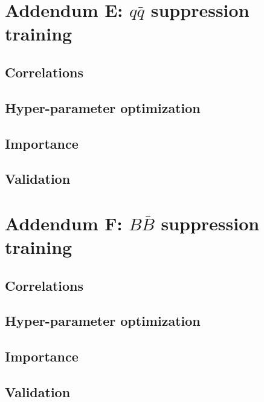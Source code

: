 \documentclass[oneside,a4paper,openany,12pt]{scrbook}
\begin{document}
\chapter*{Addendum E: $q \bar q$ suppression training}
\section*{Correlations}
\section*{Hyper-parameter optimization}
\section*{Importance}
\section*{Validation}

\chapter*{Addendum F: $B \bar B$ suppression training}
\section*{Correlations}
\section*{Hyper-parameter optimization}
\section*{Importance}
\section*{Validation}
\end{document}
